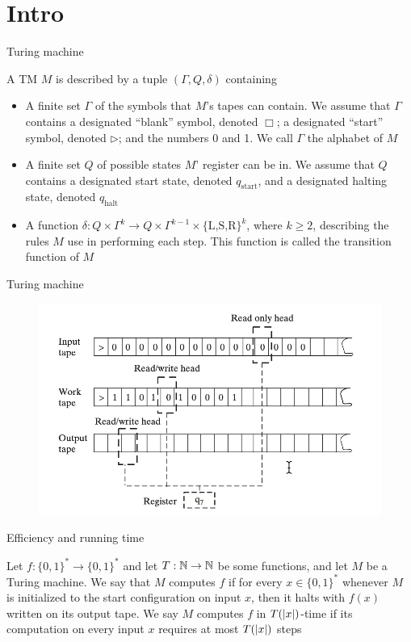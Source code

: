 \documentclass[presentation]{beamer}
\def \start {\text{start}}
\def \halt {\text{halt}}
\begin{document}
\section{Intro}
\label{sec:org98a1e2c}
\begin{frame}[label={sec:org74053a4}]{Turing machine}
\begin{definition}[]
A TM \(M\) is described by a tuple \((\Gamma,Q,\delta)\) containing
\begin{itemize}
\item A finite set \(\Gamma\) of the symbols that \(M\)'s tapes can contain. We assume that \(\Gamma\) contains a
designated ``blank'' symbol, denoted \(\Box\); a designated ``start'' symbol, denoted \(\rhd\);
and the numbers 0 and 1. We call \(\Gamma\) the \alert{alphabet} of \(M\)
\item A finite set \(Q\) of possible states \(M\)' register can be in. We assume that \(Q\) contains
a designated start state, denoted \(q_{\start}\), and a designated halting state, denoted \(q_{\halt}\)
\item A function \(\delta:Q\times\Gamma^k\to Q\times\Gamma^{k-1}\times\{\text{L,S,R}\}^k\),
where \(k\ge2\), describing the rules \(M\) use in performing each step. This function is
called the \alert{transition function} of \(M\)
\end{itemize}
\end{definition}
\end{frame}
\begin{frame}[label={sec:orgffb7e8b}]{Turing machine}
\begin{figure}[htbp]
\centering
\includegraphics[width=.7\textwidth]{./6.png}
\label{}
\end{figure}
\end{frame}
\begin{frame}[label={sec:org61184e8}]{Efficiency and running time}
\begin{definition}
Let \(f:\{0,1\}^*\to\{0,1\}^*\) and let \(T:\mathbb{N}\to\mathbb{N}\) be some functions, and let \(M\) be a Turing
machine. We say that \(M\) \alert{computes} \(f\) if for every \(x\in\{0,1\}^*\) whenever \(M\) is
initialized to the start configuration on input \(x\), then it halts with \(f(x)\) written on
its output tape. We say \(M\) \alert{computes} \(f\) in \alert{\(T(\abs{x})\)-time} if its computation on every
input \(x\) requires at most \(T(\abs{x})\) steps
\end{definition}
\end{frame}
\end{document}
